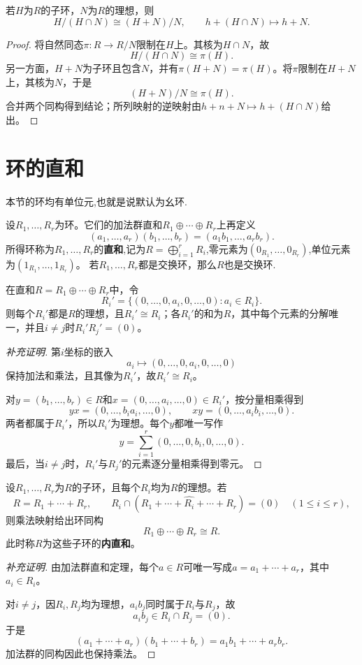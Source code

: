 \begin{theorem}\label{p2:ring-second-iso}
若$H$为$R$的子环，$N$为$R$的理想，则
\[
H/(H\cap N)\cong(H+N)/N,\qquad
h+(H\cap N)\longmapsto h+N.
\]
\end{theorem}
\begin{proof}
将自然同态$\pi:R\to R/N$限制在$H$上。其核为$H\cap N$，故
\[
H/(H\cap N)\cong\pi(H).
\]
另一方面，$H+N$为子环且包含$N$，并有$\pi(H+N)=\pi(H)$。将$\pi$限制在$H+N$上，其核为$N$，于是
\[
(H+N)/N\cong\pi(H).
\]
合并两个同构得到结论；所列映射的逆映射由$h+n+N\mapsto h+(H\cap N)$给出。
\end{proof}
\section{环的直和}

本节的环均有单位元,也就是说默认为幺环.
\begin{definition}
设$R_1,\ldots,R_r$为环。它们的加法群直和$R_1\oplus\cdots\oplus R_r$上再定义
\[
(a_1,\ldots,a_r)(b_1,\ldots,b_r)=(a_1b_1,\ldots,a_rb_r).
\]
所得环称为$R_1,\ldots,R_r$的\textbf{直和},记为$R=\bigoplus\limits_{i=1}^r R_i$,零元素为$(0_{R_1},\ldots,0_{R_r})$,单位元素为$(1_{R_1},\ldots,1_{R_r})$。
若$R_1,\ldots,R_r$都是交换环，那么$R$也是交换环.
\end{definition}


\begin{proposition}
在直和$R=R_1\oplus\cdots\oplus R_r$中，令
\[
R_i'=\{(0,\ldots,0,a_i,0,\ldots,0):a_i\in R_i\}.
\]
则每个$R_i'$都是$R$的理想，且$R_i'\cong R_i$；各$R_i'$的和为$R$，其中每个元素的分解唯一，并且$i\ne j$时$R_i'R_j'=(0)$。
\end{proposition}
\begin{proof}[补充证明]
第$i$坐标的嵌入
\[
a_i\longmapsto(0,\ldots,0,a_i,0,\ldots,0)
\]
保持加法和乘法，且其像为$R_i'$，故$R_i'\cong R_i$。

对$y=(b_1,\ldots,b_r)\in R$和$x=(0,\ldots,a_i,\ldots,0)\in R_i'$，按分量相乘得到
\[
yx=(0,\ldots,b_ia_i,\ldots,0),\qquad
xy=(0,\ldots,a_ib_i,\ldots,0).
\]
两者都属于$R_i'$，所以$R_i'$为理想。每个$y$都唯一写作
\[
y=\sum_{i=1}^r(0,\ldots,0,b_i,0,\ldots,0).
\]
最后，当$i\ne j$时，$R_i'$与$R_j'$的元素逐分量相乘得到零元。
\end{proof}

\begin{theorem}\label{p2:ring-internal-sum}
设$R_1,\ldots,R_r$为$R$的子环，且每个$R_i$均为$R$的理想。若
\[
R=R_1+\cdots+R_r,\qquad
R_i\cap(R_1+\cdots+\widehat{R_i}+\cdots+R_r)=(0)
\quad(1\leq i\leq r),
\]
则乘法映射给出环同构
\[
R_1\oplus\cdots\oplus R_r\cong R.
\]
此时称$R$为这些子环的\textbf{内直和}。
\end{theorem}
\begin{proof}[补充证明]
由加法群直和定理，每个$a\in R$可唯一写成$a=a_1+\cdots+a_r$，其中$a_i\in R_i$。

对$i\ne j$，因$R_i,R_j$均为理想，$a_ib_j$同时属于$R_i$与$R_j$，故
\[
a_ib_j\in R_i\cap R_j=(0).
\]
于是
\[
(a_1+\cdots+a_r)(b_1+\cdots+b_r)
=a_1b_1+\cdots+a_rb_r.
\]
加法群的同构因此也保持乘法。
\end{proof}

